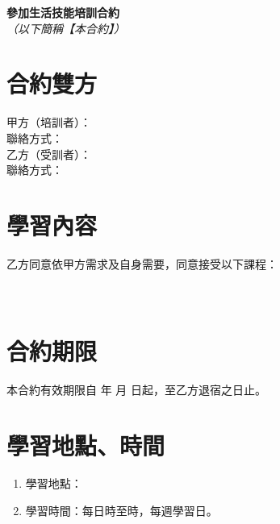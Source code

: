 \documentclass[12pt]{article}
\begin{document}
\allsectionsfont{\sffamily}
	\begin{center}
		\huge\textsf{\textbf{參加生活技能培訓合約}}\\
		\normalsize\textit{（以下簡稱【本合約】）}
	\end{center}
	\section{合約雙方}
		
		\noindent 甲方（培訓者）：\underline{\hspace{20em}}\\
		聯絡方式：\underline{\hspace{22.5em}}\\
		
		\noindent 乙方（受訓者）：\underline{\hspace{20em}}\\
		聯絡方式：\underline{\hspace{22.5em}}\\
	
	\section{學習內容}
		\noindent 乙方同意依甲方需求及自身需要，同意接受以下課程：\\
		\underline{\hspace{15cm}}\\
		\underline{\hspace{15cm}}\\
	\section{合約期限}
		本合約有效期限自 \underline{\hspace{2cm}} 年 \underline{\hspace{1cm}} 月 \underline{\hspace{1cm}} 日起，至乙方退宿之日止。
	\section{學習地點、時間}
		\begin{enumerate}
			\item 學習地點：\underline{\hspace{19em}}
			\item 學習時間：每日\underline{\hspace{2em}}時至\underline{\hspace{2em}}時，每週學習\underline{\hspace{2em}}日。
		\end{enumerate}
\end{document}
